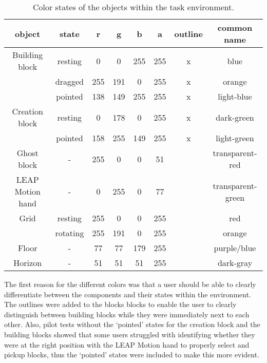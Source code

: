 \begin{table}[H]
\centering
\begin{tabular}{|c|c|c|c|c|c|c|c|}
\hline
\textbf{object} & \textbf{state} & \textbf{r} & \textbf{g} & \textbf{b} & \textbf{a} & \textbf{outline} & \textbf{common name}\\ \hline\hline
Building block & resting & 0 & 0 & 255 & 255 & x & blue \\ 
 & dragged & 255 & 191 & 0 & 255 & x & orange \\ 
 & pointed & 138 & 149 & 255 & 255 & x & light-blue \\ \hline 
Creation block & resting & 0 & 178 & 0 & 255 & x & dark-green \\ 
 & pointed & 158 & 255 & 149 & 255 & x & light-green\\ \hline 
Ghost block & - & 255 & 0 & 0 & 51 & & transparent-red \\ \hline
LEAP Motion hand & - & 0 & 255 & 0 & 77 & & transparent-green  \\ \hline 
Grid & resting & 255 & 0 & 0 & 255 & & red \\ 
 & rotating & 255 & 191 & 0 & 255 & & orange \\ \hline 
Floor & - & 77 & 77 & 179 & 255 & & purple/blue \\ \hline 
Horizon & - & 51 & 51 & 51 & 255 & & dark-gray \\ \hline 
\end{tabular}
\caption{\label{tab:colors} Color states of the objects within the task environment.}
\end{table}

\noindent The first reason for the different colors was that a user should be able to clearly differentiate between the components and their states within the environment. The outlines were added to the blocks blocks to enable the user to clearly distinguish between building blocks while they were immediately next to each other. Also, pilot tests without the `pointed' states for the creation block and the building blocks showed that some users struggled with identifying whether they were at the right position with the LEAP Motion hand to properly select and pickup blocks, thus the `pointed' states were included to make this more evident. 

